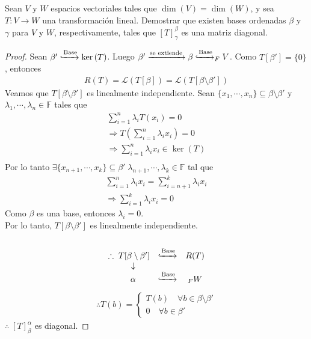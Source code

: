 \documentclass[11pt]{article}
\numberwithin{equation}{section}
\newcommand{\F}{\mathbb{F}}
\begin{document}
\begin{Problema}{} Sean $V$ y $W$ espacios vectoriales tales que $\dim(V) = \dim(W)$, y sea $T: V \to W$ una transformación lineal. 
    Demostrar que existen bases ordenadas $\beta$ y $\gamma$ para $V$ y $W$, respectivamente, tales que $[T]_{\gamma }^{\beta}$ es una matriz diagonal.
\end{Problema}      
\begin{proof}
Sean $\beta' \xhookrightarrow{\text{Base}} \ker{(T)}$. Luego $\beta' \xrightarrow{\text{se extiende}} \beta \xhookrightarrow{\text{Base}} _FV$. 
Como $T[\beta']=\{0\}$, entonces
\begin{align*}
    R(T)=\mathcal{L}(T[\beta])=\mathcal{L}(T[\beta\setminus\beta'])
\end{align*}
Veamos que $T[\beta\setminus\beta']$ es linealmente independiente. Sean $\{x_1,\cdots,x_n\}\subseteq \beta\setminus\beta'$ y $\lambda_1,\cdots,\lambda_n\in \F$ tales que
\begin{align*}
    \sum_{i=1}^{n}\lambda_i T(x_i)=0 \\
    \Rightarrow T(\sum_{i=1}^{n}\lambda_i x_i)=0 \\
    \Rightarrow \sum_{i=1}^{n}\lambda_i x_i \in \ker{(T)} \\
\end{align*}
Por lo tanto $\exists \{x_{n+1},\cdots ,x_k\}\subseteq \beta'\; \lambda_{n+1},\cdots, \lambda_k \in \F$ tal que 
\begin{align*}
    \sum_{i=1}^{n}\lambda_i x_i =\sum_{i=n+1}^{k}\lambda_i x_i\\
    \Rightarrow \sum_{i=1}^{k}\lambda_i x_i =0
\end{align*}
Como $\beta$ es una base, entonces $\lambda_i = 0$.\\
Por lo tanto, $T[\beta\setminus\beta']$ es linealmente independiente.\\
\,\\
    \[
    \begin{array}{c}
        \begin{array}{ccc}
            \therefore\; T[\beta\setminus\beta'] & \xhookrightarrow{\text{Base}} & R(T) \\
            \quad \downarrow &  & \\
            \quad\alpha& \xhookrightarrow{\text{Base}} & _FW
        \end{array}
    \end{array}
    \]
\begin{align*}
    \therefore T(b)=\begin{cases*}
        T(b) \quad \forall b\in \beta\setminus\beta' \\
        0 \quad \forall b\in \beta'
    \end{cases*}
\end{align*}
$\therefore\; [T]_{\beta}^{\alpha}$ es diagonal.
\end{proof}
\end{document}
